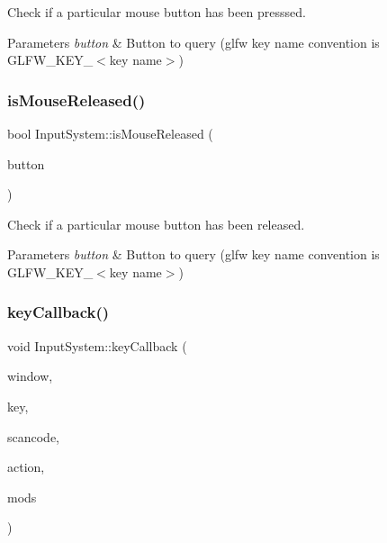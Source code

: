 Check if a particular mouse button has been presssed. 


\begin{DoxyParams}{Parameters}
{\em button} & Button to query (glfw key name convention is G\+L\+F\+W\+\_\+\+K\+E\+Y\+\_\+$<$key name$>$) \\
\hline
\end{DoxyParams}
\mbox{\label{class_input_system_ae32725811a1db2b5a72974773b8d1ef8}} 
\subsubsection{\texorpdfstring{isMouseReleased()}{isMouseReleased()}}
{\footnotesize\ttfamily bool Input\+System\+::is\+Mouse\+Released (\begin{DoxyParamCaption}\item[{int}]{button }\end{DoxyParamCaption})}



Check if a particular mouse button has been released. 


\begin{DoxyParams}{Parameters}
{\em button} & Button to query (glfw key name convention is G\+L\+F\+W\+\_\+\+K\+E\+Y\+\_\+$<$key name$>$) \\
\hline
\end{DoxyParams}
\mbox{\label{class_input_system_a5d560cf5c979be4ef7ddd176e5adfda2}} 
\subsubsection{\texorpdfstring{keyCallback()}{keyCallback()}}
{\footnotesize\ttfamily void Input\+System\+::key\+Callback (\begin{DoxyParamCaption}\item[{G\+L\+F\+Wwindow $\ast$}]{window,  }\item[{int}]{key,  }\item[{int}]{scancode,  }\item[{int}]{action,  }\item[{int}]{mods }\end{DoxyParamCaption})\hspace{0.3cm}{\ttfamily [private]}}



